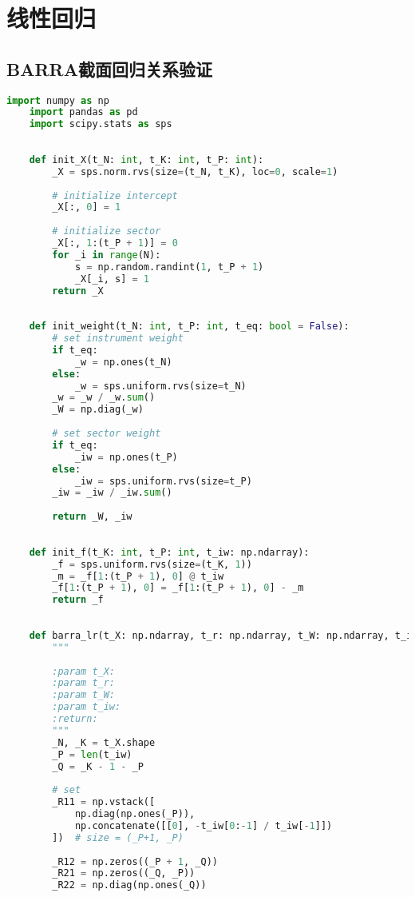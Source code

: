 \section{线性回归}
\subsection{BARRA截面回归关系验证}\label{sub_sec_code_block_lr_barra}
\begin{lstlisting}[language=Python]
    import numpy as np
    import pandas as pd
    import scipy.stats as sps
    
    
    def init_X(t_N: int, t_K: int, t_P: int):
        _X = sps.norm.rvs(size=(t_N, t_K), loc=0, scale=1)
    
        # initialize intercept
        _X[:, 0] = 1
    
        # initialize sector
        _X[:, 1:(t_P + 1)] = 0
        for _i in range(N):
            s = np.random.randint(1, t_P + 1)
            _X[_i, s] = 1
        return _X
    
    
    def init_weight(t_N: int, t_P: int, t_eq: bool = False):
        # set instrument weight
        if t_eq:
            _w = np.ones(t_N)
        else:
            _w = sps.uniform.rvs(size=t_N)
        _w = _w / _w.sum()
        _W = np.diag(_w)
    
        # set sector weight
        if t_eq:
            _iw = np.ones(t_P)
        else:
            _iw = sps.uniform.rvs(size=t_P)
        _iw = _iw / _iw.sum()
    
        return _W, _iw
    
    
    def init_f(t_K: int, t_P: int, t_iw: np.ndarray):
        _f = sps.uniform.rvs(size=(t_K, 1))
        _m = _f[1:(t_P + 1), 0] @ t_iw
        _f[1:(t_P + 1), 0] = _f[1:(t_P + 1), 0] - _m
        return _f
    
    
    def barra_lr(t_X: np.ndarray, t_r: np.ndarray, t_W: np.ndarray, t_iw: np.ndarray):
        """
    
        :param t_X:
        :param t_r:
        :param t_W:
        :param t_iw:
        :return:
        """
        _N, _K = t_X.shape
        _P = len(t_iw)
        _Q = _K - 1 - _P
    
        # set
        _R11 = np.vstack([
            np.diag(np.ones(_P)),
            np.concatenate([[0], -t_iw[0:-1] / t_iw[-1]])
        ])  # size = (_P+1, _P)
    
        _R12 = np.zeros((_P + 1, _Q))
        _R21 = np.zeros((_Q, _P))
        _R22 = np.diag(np.ones(_Q))
    

\end{lstlisting}
